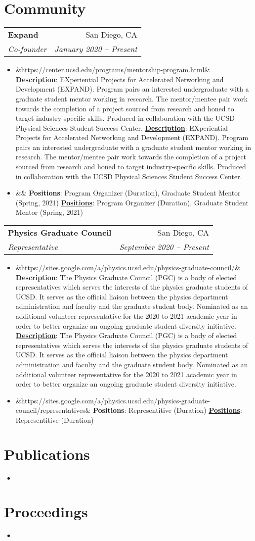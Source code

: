 \documentclass[letterpaper,11pt]{article}
\makeatletter
\newcommand{\Item}[3]{
  \item\small{
    \ifx&#1&
      \textbf{#2}{: #3 \vspace{-2pt}}
    \else
      \textbf{\href{#1}{#2}}{: #3 \vspace{-2pt}}
    \fi
  }
}
\newcommand{\Subheading}[4]{
  \vspace{-1pt}\item
    \begin{tabular*}{0.97\textwidth}{l@{\extracolsep{\fill}}r}
      \textbf{#1} & #2 \\
      \textit{\small#3} & \textit{\small #4} \\
    \end{tabular*}\vspace{-5pt}
}
\newcommand{\Section}[2]{
    \section{\texorpdfstring{#1}{o} #2}
}
\newcommand{\SubHeadingListStart}{\begin{description}[leftmargin=*]}
\newcommand{\SubHeadingListEnd}{\end{description}}
\newcommand{\ItemListStart}{\begin{itemize}}
\newcommand{\ItemListEnd}{\end{itemize}\vspace{-5pt}}
\makeatother
\begin{document}
\Section{\faGroup}{Community}
  \SubHeadingListStart
      \Subheading
      {Expand}{San Diego, CA}
      {Co-founder}{January 2020 -- Present}
      \ItemListStart
        \Item{https://center.ucsd.edu/programs/mentorship-program.html}{Description}
          {EXperiential Projects for Accelerated Networking and Development (EXPAND).  Program pairs an interested undergraduate with a graduate student mentor working in research. The mentor/mentee pair work towards the completion of a project sourced from research and honed to target industry-specific skills. Produced in collaboration with the UCSD Physical Sciences Student Success Center.}
        \Item{}{Positions}
            {Program Organizer (Duration), Graduate Student Mentor (Spring, 2021)}
      \ItemListEnd
      \Subheading
      {Physics Graduate Council}{San Diego, CA}
      {Representative}{September 2020 -- Present}
      \ItemListStart
        \Item{https://sites.google.com/a/physics.ucsd.edu/physics-graduate-council/}{Description}
          {The Physics Graduate Council (PGC) is a body of elected representatives which serves the interests of the physics graduate students of UCSD. It serves as the official liaison between the physics department administration and faculty and the graduate student body. Nominated as an  additional volunteer representative for the 2020 to 2021 academic year in order to better organize an ongoing graduate student diversity initiative.}
        \Item{https://sites.google.com/a/physics.ucsd.edu/physics-graduate-council/representatives}{Positions}
            {Representitive (Duration)}
      \ItemListEnd
  \SubHeadingListEnd
%

\Section{\faPencilSquareO}{Publications}
  \begin{itemize}
      \item {}
  \end{itemize}

\Section{\faArchive}{Proceedings}
  \begin{itemize}
      \item {}
  \end{itemize}
  
\end{document}
